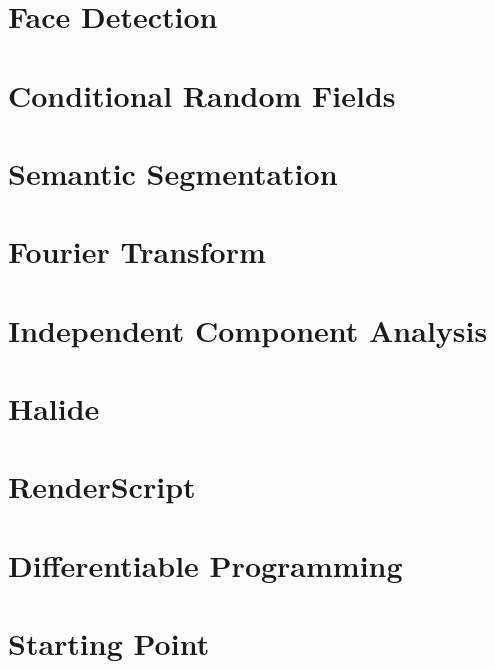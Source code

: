 \section{Face Detection}
\section{Conditional Random Fields}
\section{Semantic Segmentation}
\section{Fourier Transform}
\section{Independent Component Analysis}
\section{Halide}
\section{RenderScript}
\section{Differentiable Programming}
\section{Starting Point}